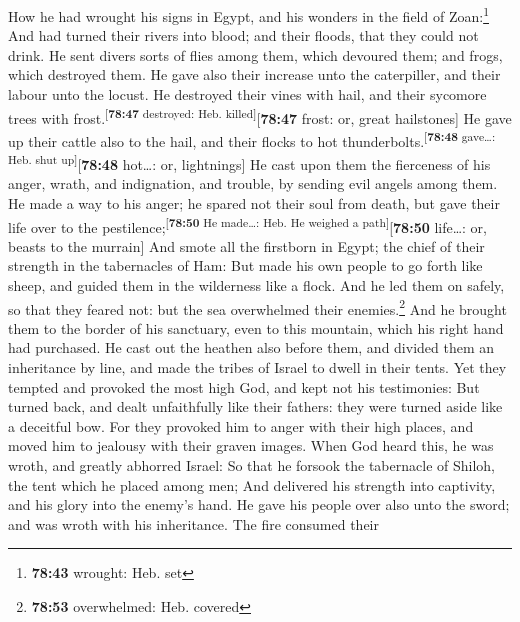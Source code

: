  How he had wrought his signs in Egypt, and his wonders
in the field of Zoan:\footnote{\textbf{78:43} wrought: Heb. set}
 And had turned their rivers into blood; and their
floods, that they could not drink.  He sent divers sorts
of flies among them, which devoured them; and frogs, which destroyed
them.  He gave also their increase unto the caterpiller,
and their labour unto the locust.  He destroyed their
vines with hail, and their sycomore trees with
frost.\textsuperscript{{[}\textbf{78:47} destroyed: Heb.
killed{]}}{[}\textbf{78:47} frost: or, great hailstones{]}
 He gave up their cattle also to the hail, and their
flocks to hot thunderbolts.\textsuperscript{{[}\textbf{78:48}
gave\ldots: Heb. shut up{]}}{[}\textbf{78:48} hot\ldots: or,
lightnings{]}  He cast upon them the fierceness of his
anger, wrath, and indignation, and trouble, by sending evil angels among
them.  He made a way to his anger; he spared not their
soul from death, but gave their life over to the
pestilence;\textsuperscript{{[}\textbf{78:50} He made\ldots: Heb. He
weighed a path{]}}{[}\textbf{78:50} life\ldots: or, beasts to the
murrain{]}  And smote all the firstborn in Egypt; the
chief of their strength in the tabernacles of Ham:  But
made his own people to go forth like sheep, and guided them in the
wilderness like a flock.  And he led them on safely, so
that they feared not: but the sea overwhelmed their enemies.\footnote{\textbf{78:53}
  overwhelmed: Heb. covered}  And he brought them to the
border of his sanctuary, even to this mountain, which his right hand had
purchased.  He cast out the heathen also before them, and
divided them an inheritance by line, and made the tribes of Israel to
dwell in their tents.  Yet they tempted and provoked the
most high God, and kept not his testimonies:  But turned
back, and dealt unfaithfully like their fathers: they were turned aside
like a deceitful bow.  For they provoked him to anger
with their high places, and moved him to jealousy with their graven
images.  When God heard this, he was wroth, and greatly
abhorred Israel:  So that he forsook the tabernacle of
Shiloh, the tent which he placed among men;  And
delivered his strength into captivity, and his glory into the enemy's
hand.  He gave his people over also unto the sword; and
was wroth with his inheritance.  The fire consumed their
